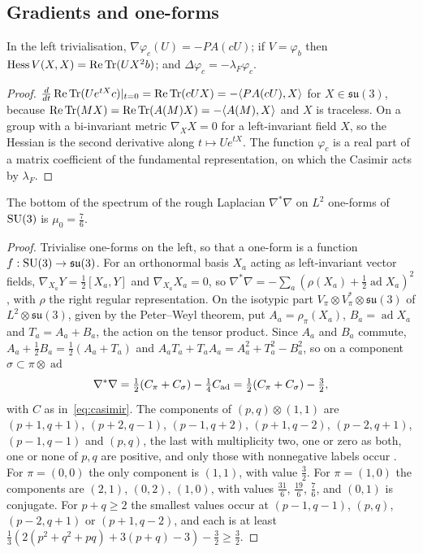\subsection{Gradients and one-forms}

\begin{lemma}\label{lem:su3gradients}
In the left trivialisation, $\nabla\varphi_c(U)=-PA(cU)$; if $V=\varphi_b$
then $\operatorname{Hess} V(X,X)=\operatorname{Re}\operatorname{Tr}(UX^2b)$; and $\Delta\varphi_c=-\lambda_F\varphi_c$.
\end{lemma}

\begin{proof}
$\frac d{dt}\operatorname{Re}\operatorname{Tr}(Ue^{tX}c)|_{t=0}=\operatorname{Re}\operatorname{Tr}(cUX)=-\langle PA(cU),X\rangle$ for $X\in
\mathfrak{su}(3)$, because $\operatorname{Re}\operatorname{Tr}(MX)=\operatorname{Re}\operatorname{Tr}(A(M)X)=-\langle A(M),X\rangle$ and $X$ is
traceless. On a group with a bi-invariant metric $\nabla_XX=0$ for a
left-invariant field $X$, so the Hessian is the second derivative along
$t\mapsto Ue^{tX}$. The function $\varphi_c$ is a real part of a matrix
coefficient of the fundamental representation, on which the Casimir acts by
$\lambda_F$.
\end{proof}

\begin{lemma}\label{lem:su3rough}
The bottom of the spectrum of the rough Laplacian $\nabla^*\nabla$ on $L^2$
one-forms of $\mathrm{SU}(3)$ is $\mu_0=\frac76$.
\end{lemma}

\begin{proof}
Trivialise one-forms on the left, so that a one-form is a function
$f:\mathrm{SU}(3)\to\mathfrak{su}(3)$. For an orthonormal basis $X_a$ acting as
left-invariant vector fields, $\nabla_{X_a}Y=\frac12[X_a,Y]$ and
$\nabla_{X_a}X_a=0$, so $\nabla^*\nabla=-\sum_a(\rho(X_a)+\frac12\operatorname{ad}
X_a)^2$, with $\rho$ the right regular representation. On the isotypic part
$V_\pi\otimes V_\pi^*\otimes\mathfrak{su}(3)$ of $L^2\otimes\mathfrak{su}(3)$,
given by the Peter--Weyl theorem, put $A_a=\rho_\pi(X_a)$, $B_a=\operatorname{ad}
X_a$ and $T_a=A_a+B_a$, the action on the tensor product. Since $A_a$ and
$B_a$ commute, $A_a+\frac12B_a=\frac12(A_a+T_a)$ and $A_aT_a+T_aA_a=A_a^2+T_a^2
-B_a^2$, so on a component $\sigma\subset\pi\otimes\operatorname{ad}$
\[
\nabla^*\nabla=\tfrac12(C_\pi+C_\sigma)-\tfrac14C_{\rm ad}=\tfrac12(C_\pi+
C_\sigma)-\tfrac32 ,
\]
with $C$ as in~\eqref{eq:casimir}. The components of $(p,q)\otimes(1,1)$
are $(p+1,q+1)$, $(p+2,q-1)$, $(p-1,q+2)$, $(p+1,q-2)$, $(p-2,q+1)$,
$(p-1,q-1)$ and $(p,q)$, the last with multiplicity two, one or zero as both,
one or none of $p,q$ are positive, and only those with nonnegative labels
occur \cite[Sec.~13.2]{FH91}. For $\pi=(0,0)$ the only component is $(1,1)$,
with value $\frac32$. For $\pi=(1,0)$ the components are $(2,1)$, $(0,2)$,
$(1,0)$, with values $\frac{31}6$, $\frac{19}6$, $\frac76$, and $(0,1)$ is
conjugate. For $p+q\ge2$ the smallest values occur at $(p-1,q-1)$, $(p,q)$,
$(p-2,q+1)$ or $(p+1,q-2)$, and each is at least $\frac13(2(p^2+q^2+pq)+3(p+q)
-3)-\frac32\ge\frac32$.
\end{proof}

